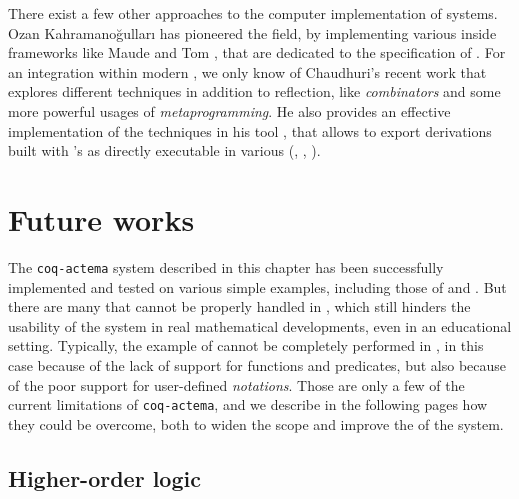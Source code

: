 \begin{remark}
  There exist a few other approaches to the computer implementation of  systems. Ozan Kahramanoğulları has pioneered the field, by
  implementing various  inside frameworks like Maude
  \cite{kahramanogullari_maude_2008} and Tom
  \cite{kahramanogullari_implementing_2005}, that are dedicated to the
  specification of . For an integration within modern
  , we only know of Chaudhuri's recent work
   that explores different techniques in
  addition to reflection, like \emph{combinators} and some more powerful usages
  of \emph{metaprogramming}. He also provides an effective implementation of the
  techniques in his  tool \cite{DBLP:conf/cade/Chaudhuri21}, that
  allows to export  derivations built with 's
   as  directly executable in various  (, , ).
\end{remark}

\section{Future works}

The \texttt{coq-actema} system described in this chapter has been successfully
implemented and tested on various simple examples, including those of
 and . But there are many   that cannot be
properly handled in , which still hinders the usability of the system in
real mathematical developments, even in an educational setting. Typically, the
example of  cannot be completely performed in , in this case
because of the lack of support for \emph{} functions and predicates,
but also because of the poor support for user-defined \emph{notations}. Those
are only a few of the current limitations of \texttt{coq-actema}, and we
describe in the following pages how they could be overcome, both to widen the
scope and improve the  of the system.

\subsection{Higher-order logic}


